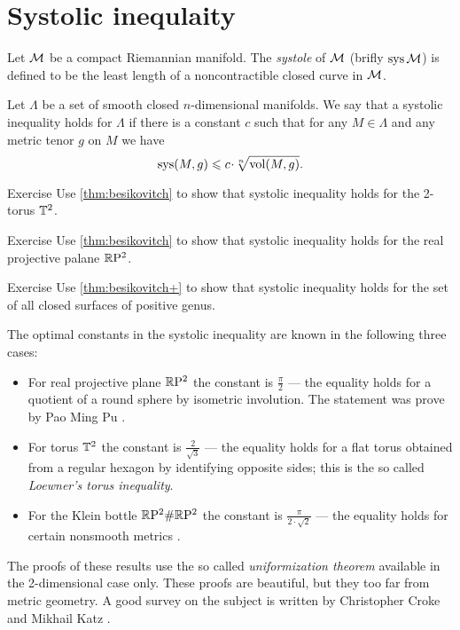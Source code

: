 \section{Systolic inequlaity}

Let $\mathcal{M}$ be a compact Riemannian manifold.
The \emph{systole} of $\mathcal{M}$ (brifly $\mathop{\rm sys}\nolimits\mathcal{M}$) is defined to be the least length of a noncontractible closed curve in $\mathcal{M}$.

Let $\Lambda$ be a set of smooth closed $n$-dimensional manifolds.
We say that a systolic inequality holds for $\Lambda$ if there is a constant $c$ such that for any $M\in \Lambda$ and any metric tenor $g$ on $M$ we have
\[\sys(M,g)\le c\cdot \sqrt[n]{\vol(M,g)}.\]

\begin{thm}{Exercise}\label{ex:sysT2}
Use \ref{thm:besikovitch} to show that systolic inequality holds for the 2-torus $\mathbb{T}^2$.
\end{thm}

\begin{thm}{Exercise}\label{ex:sysRP2}
Use \ref{thm:besikovitch} to show that systolic inequality holds for the real projective palane $\mathbb{R}\mathrm{P}^2$.
\end{thm}

\begin{thm}{Exercise}\label{ex:sysSg}
Use \ref{thm:besikovitch+} to show that systolic inequality holds for the set of all closed surfaces of positive genus.
\end{thm}

The optimal constants in the systolic inequality are known in the following three cases:
\begin{itemize}
\item For real projective plane $\mathbb{R}\mathrm{P}^2$ the constant is $\tfrac\pi2$ --- the equality holds for a quotient of a round sphere by isometric involution. The statement was prove by Pao Ming Pu \cite{pu}.\label{page:pu}
\item For torus $\mathbb{T}^2$ the constant is $\tfrac2{\sqrt{3}}$ --- the equality holds for a flat torus obtained from a regular hexagon by identifying opposite sides; this is the so called \emph{Loewner's torus inequality}.
\item For the Klein bottle $\mathbb{R}\mathrm{P}^2\#\mathbb{R}\mathrm{P}^2$  the constant is $\tfrac\pi{2\cdot\sqrt2}$ --- the equality holds for certain nonsmooth metrics \cite{bavard}.
\end{itemize}
The proofs of these results use the so called \emph{uniformization theorem}   available in the 2-dimensional case only.
These proofs are beautiful, but they too far from metric geometry.
A good survey on the subject is written by Christopher Croke and Mikhail Katz \cite{croke-katz}.

